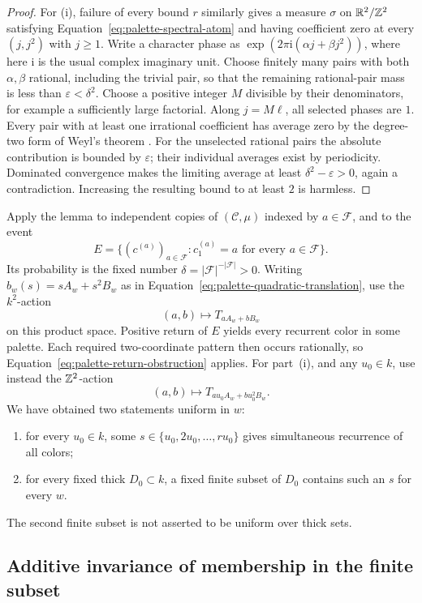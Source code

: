 \begin{proof}
For \textup{(i)}, failure of every bound $r$ similarly gives a measure
$\sigma$ on $\mathbb R^2/\mathbb Z^2$ satisfying
Equation~\ref{eq:palette-spectral-atom} and having coefficient zero at
every $(j,j^2)$ with $j\geq1$. Write a character phase as
$\exp(2\pi\mathrm i(\alpha j+\beta j^2))$, where here $\mathrm i$
is the usual complex imaginary unit. Choose finitely many pairs with
both $\alpha,\beta$ rational, including the trivial pair, so that the
remaining rational-pair mass is less than
$\varepsilon<\delta^2$. Choose a positive integer $M$ divisible by
their denominators, for example a sufficiently large factorial.
Along $j=M\ell$, all selected phases are $1$. Every pair with at least
one irrational coefficient has average zero by the degree-two form of
Weyl's theorem \cite{Weyl}. For the unselected rational pairs the
absolute contribution is bounded by $\varepsilon$; their individual
averages exist by periodicity. Dominated convergence makes the limiting
average at least $\delta^2-\varepsilon>0$, again a contradiction.
Increasing the resulting bound to at least $2$ is harmless.
\end{proof}

Apply the lemma to independent copies of $(\mathcal C,\mu)$ indexed by
$a\in\mathcal F$, and to the event
\[
 E=\{(c^{(a)})_{a\in\mathcal F}:c^{(a)}_1=a
       \text{ for every }a\in\mathcal F\}.
\]
Its probability is the fixed number
$\delta=|\mathcal F|^{-|\mathcal F|}>0$.
Writing $b_w(s)=sA_w+s^2B_w$ as in
Equation~\ref{eq:palette-quadratic-translation}, use the $k^2$-action
\[
 (a,b)\longmapsto T_{aA_w+bB_w}
\]
on this product space. Positive return of $E$ yields every recurrent
color in some palette. Each required two-coordinate pattern then
occurs rationally, so Equation~\ref{eq:palette-return-obstruction}
applies. For part~\textup{(i)}, and any $u_0\in k$, use instead the
$\mathbb Z^2$-action
\[
 (a,b)\longmapsto T_{a u_0A_w+b u_0^2B_w}.
\]
We have obtained two statements uniform in $w$:
\begin{enumerate}[label=\textup{(\alph*)}]
\item for every $u_0\in k$, some $s\in\{u_0,2u_0,\ldots,ru_0\}$
gives simultaneous recurrence of all colors;
\item for every fixed thick $D_0\subset k$, a fixed finite subset of
$D_0$ contains such an $s$ for every $w$.
\end{enumerate}
The second finite subset is not asserted to be uniform over thick sets.

\subsection{Additive invariance of membership in the finite subset}

